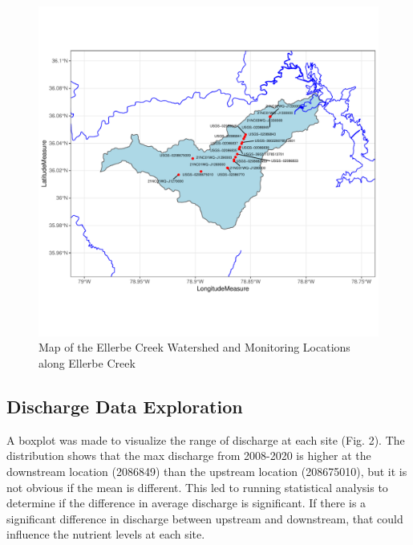 \documentclass[12pt,]{article}
\begin{document}
\begin{figure}
\centering
\includegraphics{Landman_ENV872_Project_files/figure-latex/Exploratory Analysis Figure 1-1.pdf}
\caption{Map of the Ellerbe Creek Watershed and Monitoring Locations
along Ellerbe Creek}
\end{figure}

\newpage

\hypertarget{discharge-data-exploration}{%
\subsection{Discharge Data
Exploration}\label{discharge-data-exploration}}

A boxplot was made to visualize the range of discharge at each site
(Fig. 2). The distribution shows that the max discharge from 2008-2020
is higher at the downstream location (2086849) than the upstream
location (208675010), but it is not obvious if the mean is different.
This led to running statistical analysis to determine if the difference
in average discharge is significant. If there is a significant
difference in discharge between upstream and downstream, that could
influence the nutrient levels at each site.
\end{document}
